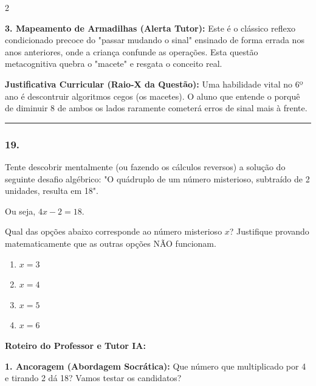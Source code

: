 \begin{multicols*}{2}
\begin{tcolorbox}[colback=CorTitUm!5, colframe=CorTitUm, boxrule=1pt, arc=4pt, left=6pt, right=6pt, top=6pt, bottom=6pt]
    \textbf{3. Mapeamento de Armadilhas (Alerta Tutor):} Este é o clássico reflexo condicionado precoce do "passar mudando o sinal" ensinado de forma errada nos anos anteriores, onde a criança confunde as operações. Esta questão metacognitiva quebra o "macete" e resgata o conceito real.
    \end{tcolorbox}
    \vspace{0.15cm}
    
    \begin{boxexplicacao}
    \textbf{Justificativa Curricular (Raio-X da Questão):} Uma habilidade vital no 6º ano é descontruir algoritmos cegos (os macetes). O aluno que entende o porquê de diminuir 8 de ambos os lados raramente cometerá erros de sinal mais à frente.
    \end{boxexplicacao}
\fi

\par\vspace{\espacoQuestao}

\noindent\textcolor{CorLinha}{\rule{\linewidth}{0.5pt}} 
\par\vspace{\espacoPreQuestao}
\subsubsection*{19.} 
\begin{enunciadoLiteral}
Tente descobrir mentalmente (ou fazendo os cálculos reversos) a solução do seguinte desafio algébrico: "O quádruplo de um número misterioso, subtraído de 2 unidades, resulta em 18". 

Ou seja, $ 4x - 2 = 18 $.

Qual das opções abaixo corresponde ao número misterioso $x$? Justifique provando matematicamente que as outras opções NÃO funcionam.

\begin{enumerate}[label=\alph*), itemsep=\espacoAlt]
    \item $ x = 3 $
    \item $ x = 4 $
    \item $ x = 5 $
    \item $ x = 6 $
\end{enumerate}
\end{enunciadoLiteral}

\ifgabarito
    \begin{tcolorbox}[colback=CorTitUm!5, colframe=CorTitUm, boxrule=1pt, arc=4pt, left=6pt, right=6pt, top=6pt, bottom=6pt]
    \small\textbf{\textcolor{CorTitUm}{Roteiro do Professor e Tutor IA:}}\par\vspace{0.1cm}
    \color{CinzaEscuro}
    \textbf{1. Ancoragem (Abordagem Socrática):} Que número que multiplicado por 4 e tirando 2 dá 18? Vamos testar os candidatos?\par\vspace{0.1cm}
    

\end{tcolorbox}
\end{multicols*}
